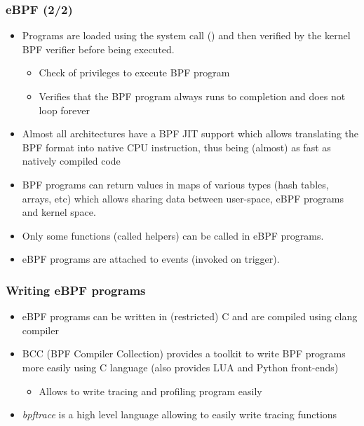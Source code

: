 \begin{frame}
  \frametitle{eBPF (2/2)}
  \begin{itemize}
    \item Programs are loaded using the  system call
          () and then verified by the kernel BPF verifier before
          being executed.
    \begin{itemize}
      \item Check of privileges to execute BPF program
      \item Verifies that the BPF program always runs to completion and does not
            loop forever
    \end{itemize}
    \item Almost all architectures have a BPF JIT support which allows
          translating the BPF format into native CPU instruction, thus being
          (almost) as fast as natively compiled code
    \item BPF programs can return values in maps of various types (hash tables,
          arrays, etc) which allows sharing data between user-space, eBPF
          programs and kernel space.
    \item Only some functions (called helpers) can be called in eBPF programs.
    \item eBPF programs are attached to events (invoked on trigger).
  \end{itemize}
\end{frame}

\begin{frame}[fragile]
  \frametitle{Writing eBPF programs}
  \begin{itemize}
    \item eBPF programs can be written in (restricted) C and are compiled
          using clang compiler
    \item BCC (BPF Compiler Collection) provides a toolkit to write BPF
          programs more easily using C language (also provides LUA and Python
          front-ends)
    \begin{itemize}
      \item Allows to write tracing and profiling program easily
    \end{itemize}
    \item {\em bpftrace} is a high level language allowing to easily write tracing
          functions
  \end{itemize}
\end{frame}

